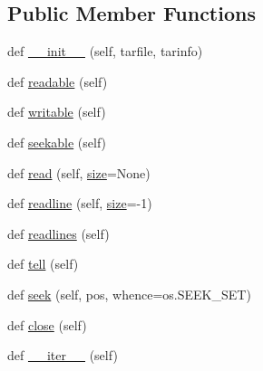 \subsection*{Public Member Functions}
\begin{DoxyCompactItemize}
\item 
def \hyperlink{classpip_1_1__vendor_1_1distlib_1_1__backport_1_1tarfile_1_1ExFileObject_ae399b8da7bad7344a1c5d735929ab4ca}{\+\_\+\+\_\+init\+\_\+\+\_\+} (self, tarfile, tarinfo)
\item 
def \hyperlink{classpip_1_1__vendor_1_1distlib_1_1__backport_1_1tarfile_1_1ExFileObject_a490015524209555f54f6a85d5a79fc7e}{readable} (self)
\item 
def \hyperlink{classpip_1_1__vendor_1_1distlib_1_1__backport_1_1tarfile_1_1ExFileObject_abb498b4aac6eeb5fe7f2bfa75948fcbf}{writable} (self)
\item 
def \hyperlink{classpip_1_1__vendor_1_1distlib_1_1__backport_1_1tarfile_1_1ExFileObject_a2740a32668ba7093c77e243217ee4da5}{seekable} (self)
\item 
def \hyperlink{classpip_1_1__vendor_1_1distlib_1_1__backport_1_1tarfile_1_1ExFileObject_ad4e1ba05583b5f47d6bb410d308bc913}{read} (self, \hyperlink{classpip_1_1__vendor_1_1distlib_1_1__backport_1_1tarfile_1_1ExFileObject_a5ddd1002fc99b7e3796697abb39e16c7}{size}=None)
\item 
def \hyperlink{classpip_1_1__vendor_1_1distlib_1_1__backport_1_1tarfile_1_1ExFileObject_aa0a578a5d6927dd1c4dec6310f17b200}{readline} (self, \hyperlink{classpip_1_1__vendor_1_1distlib_1_1__backport_1_1tarfile_1_1ExFileObject_a5ddd1002fc99b7e3796697abb39e16c7}{size}=-\/1)
\item 
def \hyperlink{classpip_1_1__vendor_1_1distlib_1_1__backport_1_1tarfile_1_1ExFileObject_a7289694a3a5b9e404db56a20c4dfb549}{readlines} (self)
\item 
def \hyperlink{classpip_1_1__vendor_1_1distlib_1_1__backport_1_1tarfile_1_1ExFileObject_a63fe1519f28ce433a33eed6cf9bc2e59}{tell} (self)
\item 
def \hyperlink{classpip_1_1__vendor_1_1distlib_1_1__backport_1_1tarfile_1_1ExFileObject_a0a8181da1f10c5d91506c33aa70cb500}{seek} (self, pos, whence=os.\+S\+E\+E\+K\+\_\+\+S\+ET)
\item 
def \hyperlink{classpip_1_1__vendor_1_1distlib_1_1__backport_1_1tarfile_1_1ExFileObject_abc2ddbaf5cab611331d48f0216115774}{close} (self)
\item 
def \hyperlink{classpip_1_1__vendor_1_1distlib_1_1__backport_1_1tarfile_1_1ExFileObject_a8eeb290f20d53d25675c48f6e2582cdd}{\+\_\+\+\_\+iter\+\_\+\+\_\+} (self)
\end{DoxyCompactItemize}
